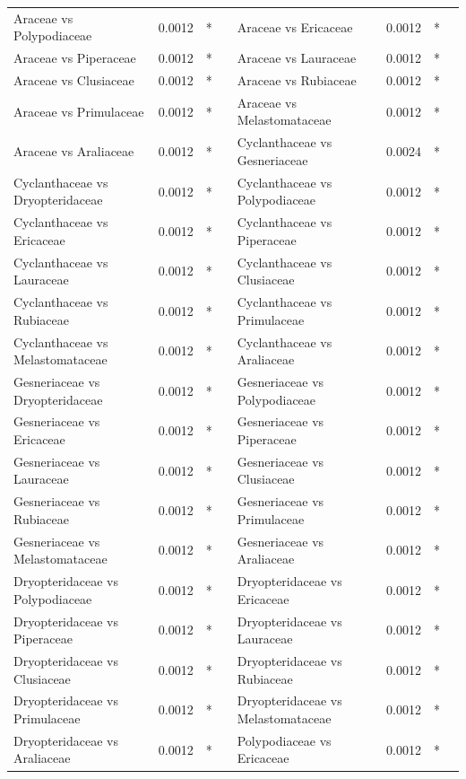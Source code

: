 \documentclass[a4paper,12pt]{article}
\begin{document}
\begin{table}[H]
\begin{tabular}{lccc|lccc}
        Araceae vs Polypodiaceae & 0.0012 & * & & Araceae vs Ericaceae & 0.0012 & * \\
        Araceae vs Piperaceae & 0.0012 & * & & Araceae vs Lauraceae & 0.0012 & * \\
        Araceae vs Clusiaceae & 0.0012 & * & & Araceae vs Rubiaceae & 0.0012 & * \\
        Araceae vs Primulaceae & 0.0012 & * & & Araceae vs Melastomataceae & 0.0012 & * \\
        Araceae vs Araliaceae & 0.0012 & * & & Cyclanthaceae vs Gesneriaceae & 0.0024 & * \\
        Cyclanthaceae vs Dryopteridaceae & 0.0012 & * & & Cyclanthaceae vs Polypodiaceae & 0.0012 & * \\
        Cyclanthaceae vs Ericaceae & 0.0012 & * & & Cyclanthaceae vs Piperaceae & 0.0012 & * \\
        Cyclanthaceae vs Lauraceae & 0.0012 & * & & Cyclanthaceae vs Clusiaceae & 0.0012 & * \\
        Cyclanthaceae vs Rubiaceae & 0.0012 & * & & Cyclanthaceae vs Primulaceae & 0.0012 & * \\
        Cyclanthaceae vs Melastomataceae & 0.0012 & * & & Cyclanthaceae vs Araliaceae & 0.0012 & * \\
        Gesneriaceae vs Dryopteridaceae & 0.0012 & * & & Gesneriaceae vs Polypodiaceae & 0.0012 & * \\
        Gesneriaceae vs Ericaceae & 0.0012 & * & & Gesneriaceae vs Piperaceae & 0.0012 & * \\
        Gesneriaceae vs Lauraceae & 0.0012 & * & & Gesneriaceae vs Clusiaceae & 0.0012 & * \\
        Gesneriaceae vs Rubiaceae & 0.0012 & * & & Gesneriaceae vs Primulaceae & 0.0012 & * \\
        Gesneriaceae vs Melastomataceae & 0.0012 & * & & Gesneriaceae vs Araliaceae & 0.0012 & * \\
        Dryopteridaceae vs Polypodiaceae & 0.0012 & * & & Dryopteridaceae vs Ericaceae & 0.0012 & * \\
        Dryopteridaceae vs Piperaceae & 0.0012 & * & & Dryopteridaceae vs Lauraceae & 0.0012 & * \\
        Dryopteridaceae vs Clusiaceae & 0.0012 & * & & Dryopteridaceae vs Rubiaceae & 0.0012 & * \\
        Dryopteridaceae vs Primulaceae & 0.0012 & * & & Dryopteridaceae vs Melastomataceae & 0.0012 & * \\
        Dryopteridaceae vs Araliaceae & 0.0012 & * & & Polypodiaceae vs Ericaceae & 0.0012 & * \\

\end{tabular}
\end{table}
\end{document}
